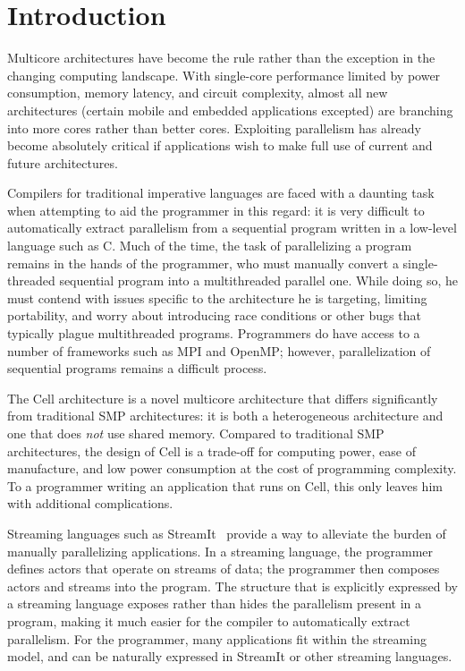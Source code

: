 \chapter{Introduction}

Multicore architectures have become the rule rather than the exception in the changing computing landscape. With single-core performance limited by power consumption, memory latency, and circuit complexity, almost all new architectures (certain mobile and embedded applications excepted) are branching into more cores rather than better cores. Exploiting parallelism has already become absolutely critical if applications wish to make full use of current and future architectures.

Compilers for traditional imperative languages are faced with a daunting task when attempting to aid the programmer in this regard: it is very difficult to automatically extract parallelism from a sequential program written in a low-level language such as C. Much of the time, the task of parallelizing a program remains in the hands of the programmer, who must manually convert a single-threaded sequential program into a multithreaded parallel one. While doing so, he must contend with issues specific to the architecture he is targeting, limiting portability, and worry about introducing race conditions or other bugs that typically plague multithreaded programs. Programmers do have access to a number of frameworks such as MPI and OpenMP; however, parallelization of sequential programs remains a difficult process.

The Cell architecture is a novel multicore architecture that differs significantly from traditional SMP architectures: it is both a heterogeneous architecture and one that does \emph{not} use shared memory. Compared to traditional SMP architectures, the design of Cell is a trade-off for computing power, ease of manufacture, and low power consumption at the cost of programming complexity. To a programmer writing an application that runs on Cell, this only leaves him with additional complications.

Streaming languages such as StreamIt~\cite{asplos02} provide a way to alleviate the burden of manually parallelizing applications. In a streaming language, the programmer defines actors that operate on streams of data; the programmer then composes actors and streams into the program. The structure that is explicitly expressed by a streaming language exposes rather than hides the parallelism present in a program, making it much easier for the compiler to automatically extract parallelism. For the programmer, many applications fit within the streaming model, and can be naturally expressed in StreamIt or other streaming languages.

